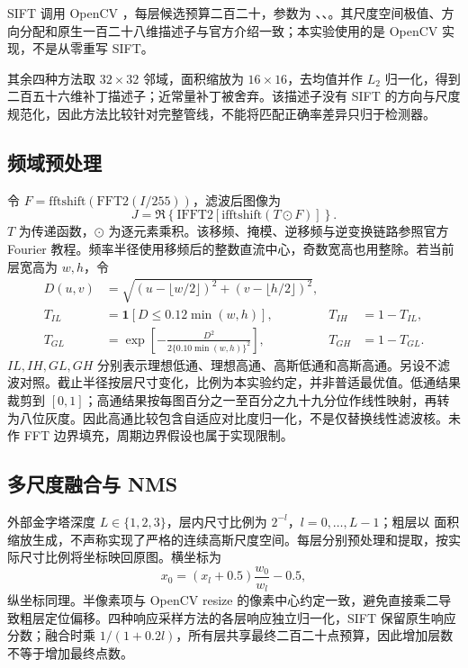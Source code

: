 SIFT 调用 OpenCV ，每层候选预算二百二十，参数为 、、。其尺度空间极值、方向分配和原生一百二十八维描述子与官方介绍一致\cite{sift}；本实验使用的是 OpenCV 实现，不是从零重写 SIFT。

其余四种方法取 $32\times32$ 邻域，面积缩放为 $16\times16$，去均值并作 $L_2$ 归一化，得到二百五十六维补丁描述子；近常量补丁被舍弃。该描述子没有 SIFT 的方向与尺度规范化，因此方法比较针对完整管线，不能将匹配正确率差异只归于检测器。

\subsection{频域预处理}
令 $F=\mathrm{fftshift}(\mathrm{FFT2}(I/255))$，滤波后图像为
\begin{equation}
J=\Re\left\{\mathrm{IFFT2}\left[\mathrm{ifftshift}(T\odot F)\right]\right\}.
\end{equation}
$T$ 为传递函数，$\odot$ 为逐元素乘积。该移频、掩模、逆移频与逆变换链路参照官方 Fourier 教程\cite{fourier}。频率半径使用移频后的整数直流中心，奇数宽高也用整除。若当前层宽高为 $w,h$，令
\begin{align}
D(u,v)&=\sqrt{(u-\lfloor w/2\rfloor)^2+(v-\lfloor h/2\rfloor)^2},\\
T_{IL}&=\mathbf{1}[D\leq0.12\min(w,h)],&T_{IH}&=1-T_{IL},\\
T_{GL}&=\exp\left[-\frac{D^2}{2\{0.10\min(w,h)\}^2}\right],&T_{GH}&=1-T_{GL}.
\end{align}
$IL,IH,GL,GH$ 分别表示理想低通、理想高通、高斯低通和高斯高通。另设不滤波对照。截止半径按层尺寸变化，比例为本实验约定，并非普适最优值。低通结果裁剪到 $[0,1]$；高通结果按每图百分之一至百分之九十九分位作线性映射，再转为八位灰度。因此高通比较包含自适应对比度归一化，不是仅替换线性滤波核。未作 FFT 边界填充，周期边界假设也属于实现限制。

\subsection{多尺度融合与 NMS}
外部金字塔深度 $L\in\{1,2,3\}$，层内尺寸比例为 $2^{-l}$，$l=0,\ldots,L-1$；粗层以  面积缩放生成，不声称实现了严格的连续高斯尺度空间。每层分别预处理和提取，按实际尺寸比例将坐标映回原图。横坐标为
\begin{equation}
x_0=(x_l+0.5)\frac{w_0}{w_l}-0.5,
\end{equation}
纵坐标同理。半像素项与 OpenCV resize 的像素中心约定一致，避免直接乘二导致粗层定位偏移。四种响应采样方法的各层响应独立归一化，SIFT 保留原生响应分数；融合时乘 $1/(1+0.2l)$，所有层共享最终二百二十点预算，因此增加层数不等于增加最终点数。


